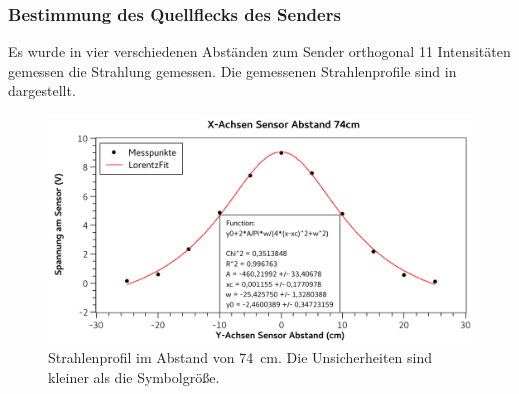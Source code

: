 \documentclass[
	a4paper,
	12pt,
	pagesize,
	ngerman
]{scrartcl}
\begin{document}
	\subsubsection{Bestimmung des Quellflecks des Senders}
	Es wurde in vier verschiedenen Abständen zum Sender orthogonal 11 Intensitäten gemessen die Strahlung gemessen. %
	Die gemessenen Strahlenprofile sind in  dargestellt. 
	\begin{figure}[H] %
		\includegraphics[width=1\textwidth]{fig_74cm}
		\centering
		\caption{Strahlenprofil im Abstand von \SI{74}{cm}. Die Unsicherheiten sind kleiner als die Symbolgröße.}
		\label{fig_74cm}
		\centering
	\end{figure}
\end{document}
